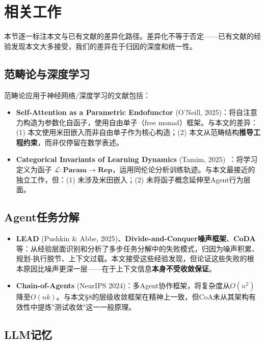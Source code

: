 \documentclass[11pt,a4paper]{ctexart}
\begin{document}
\section{相关工作}

本节逐一标注本文与已有文献的差异化路径。差异化不等于否定——已有文献的经验发现本文大多接受，我们的差异在于归因的深度和统一性。

\subsection{范畴论与深度学习}

范畴论应用于神经网络/深度学习的文献包括：
\begin{itemize}[leftmargin=*]
    \item \textbf{Self-Attention as a Parametric Endofunctor} (O'Neill, 2025)：将自注意力构造为参数化自函子，使用自由单子（free monad）框架。与本文的差异：(1) 本文使用米田嵌入而非自由单子作为核心构造；(2) 本文从范畴结构\textbf{推导工程约束}，而非仅停留在数学表述。
    \item \textbf{Categorical Invariants of Learning Dynamics} (Tamim, 2025)\ \cite{Tamim2025Categorical}：将学习定义为函子 $\mathcal{L}: \mathbf{Param} \to \mathbf{Rep}$，运用同伦论分析训练轨迹。与本文最接近的独立工作，但：(1) 未涉及米田嵌入；(2) 未将函子概念延伸至Agent行为层面。
\end{itemize}

\subsection{Agent任务分解}

\begin{itemize}[leftmargin=*]
    \item \textbf{LEAD} (Pushkin \& Abbe, 2025)\cite{LEAD2025}、\textbf{Divide-and-Conquer噪声框架}、\textbf{CoDA}等：从经验层面识别和分析了多步任务分解中的失败模式，归因为噪声积累、规划-执行脱节、上下文过载。本文接受这些经验发现，但论证这些失败的根本原因比噪声更深一层——在于上下文信息\textbf{本身不受收敛保证}。
    \item \textbf{Chain-of-Agents} (NeurIPS 2024)：多Agent协作框架，将复杂度从$O(n^2)$降至$O(nk)$。与本文§8的层级收敛框架在精神上一致，但CoA未从其架构有效性中提炼"测试收敛"这一一般原理。
\end{itemize}

\subsection{LLM记忆}
\end{document}
